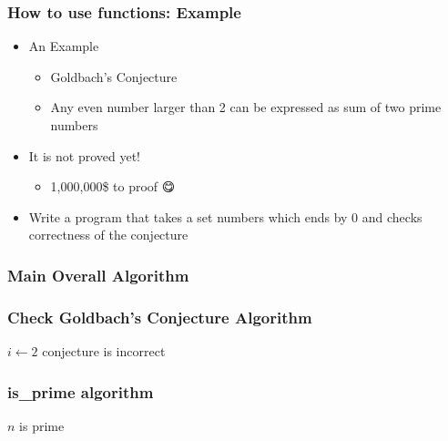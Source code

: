 \documentclass{../c-lecture}
\begin{document}
\begin{frame}
  \frametitle{How to use functions: Example}
  \begin{itemize}
    \item An Example
    \begin{itemize}
      \item Goldbach’s Conjecture
      \item
        Any even number larger than 2 can be expressed as sum of two prime
        numbers
    \end{itemize}
    \item It is not proved yet!
    \begin{itemize}
      \item 1,000,000\$ to proof 😋
    \end{itemize}
    \item
      Write a program that takes a set numbers which ends by 0 and checks
      correctness of the conjecture
  \end{itemize}
\end{frame}

\begin{frame}[fragile]
  \frametitle{Main Overall Algorithm}
  \begin{algorithm}[H]
  \end{algorithm}
\end{frame}

\begin{frame}[fragile]
  \frametitle{Check Goldbach's Conjecture Algorithm}
  \begin{algorithm}[H]
  $i \gets 2$\;
  conjecture is incorrect
  \end{algorithm}
\end{frame}

\begin{frame}
  \frametitle{is\_prime algorithm}
  \begin{algorithm}[H]
  $n$ is prime\;
  \end{algorithm}
\end{frame}
\end{document}
